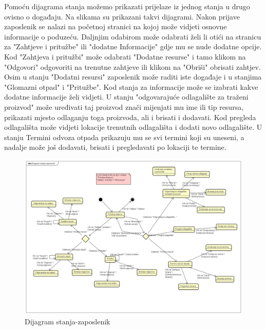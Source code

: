 %			
%			
		Pomoću dijagrama stanja možemo prikazati prijelaze iz jednog stanja u drugo ovisno o događaju. Na slikama su prikazani takvi dijagrami. Nakon prijave zaposlenik se nalazi na početnoj stranici na kojoj može vidjeti osnovne informacije o poduzeću. Daljnjim odabirom može odabrati želi li otići na stranicu za "Zahtjeve i pritužbe" ili "dodatne Informacije" gdje mu se nude dodatne opcije. Kod "Zahtjeva i pritužbi" može odabrati "Dodatne resurse" i tamo klikom na "Odgovori" odgovoriti na trenutne zahtjeve ili klikom na "Obriši" obrisati zahtjev. Osim u stanju "Dodatni resursi" zaposlenik može raditi iste događaje i u stanjima  "Glomazni otpad" i "Pritužbe". Kod stanja za informacije može se izabrati kakve dodatne informacije želi vidjeti. U stanju "odgovarajuće odlagalište za traženi proizvod" može uređivati taj proizvod znači mijenjati mu ime ili tip resursa, prikazati mjesto odlaganju toga proizvoda, ali i brisati i dodavati. Kod pregleda odlagališta može vidjeti lokacije trenutnih odlagališta i dodati novo odlagalište. U stanju Termini odvoza otpada prikazuju mu se svi termini koji su uneseni, a nadalje može još dodavati, brisati i pregledavati po lokaciji te termine.
		\begin{figure}[H]
			\includegraphics[width=\linewidth]{dijagrami/Dijagram stanja-zaposlenik.png}
			\centering
			\caption{Dijagram stanja-zaposlenik}
			\label{fig:dijagram_stanja-zaposlenik}
		\end{figure}
	
